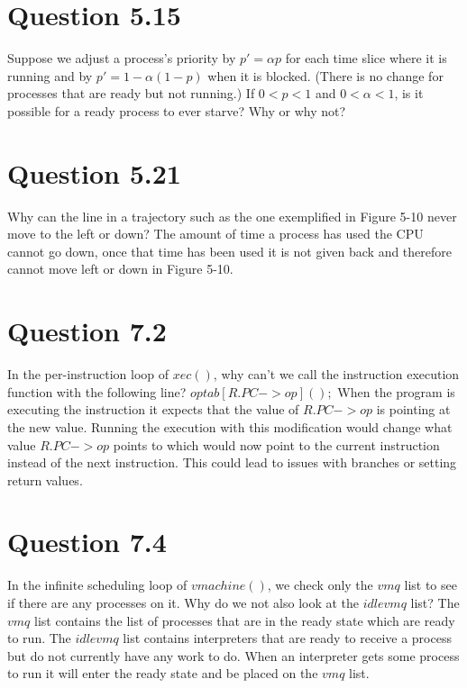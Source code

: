 \documentclass{article}
\begin{document}
\section*{Question 5.15}
Suppose we adjust a process's priority by $p' = \alpha p$ for each time slice where it is running and by $p' = 1 - \alpha (1-p)$ when it is blocked.
(There is no change for processes that are ready but not running.)
If $0<p<1$ and $0<\alpha<1$, is it possible for a ready process to ever starve? Why or why not?
\newline
\newline


\section*{Question 5.21}
Why can the line in a trajectory such as the one exemplified in Figure 5-10 never move to the left or down?
\newline
\newline
The amount of time a process has used the CPU cannot go down, once that time has been used it is not given back and therefore cannot move left or down in Figure 5-10.

\section*{Question 7.2}
In the per-instruction loop of $xec()$, why can't we call the instruction execution function with the following line? $optab[R.PC->op]();$
\newline
\newline
When the program is executing the instruction it expects that the value of $R.PC->op$ is pointing at the new value.
Running the execution with this modification would change what value $R.PC->op$ points to which would now point to the current instruction instead of the next instruction. This could lead to issues with branches or setting return values.

\section*{Question 7.4}
In the infinite scheduling loop of $vmachine()$, we check only the $vmq$ list to see if there are any processes on it. Why do we not also look at the $idlevmq$ list?
\newline
\newline
The $vmq$ list contains the list of processes that are in the ready state which are ready to run. The $idlevmq$ list contains interpreters that are ready to receive a process but do not currently have any work to do. When an interpreter gets some process to run it will enter the ready state and be placed on the $vmq$ list.
\end{document}

